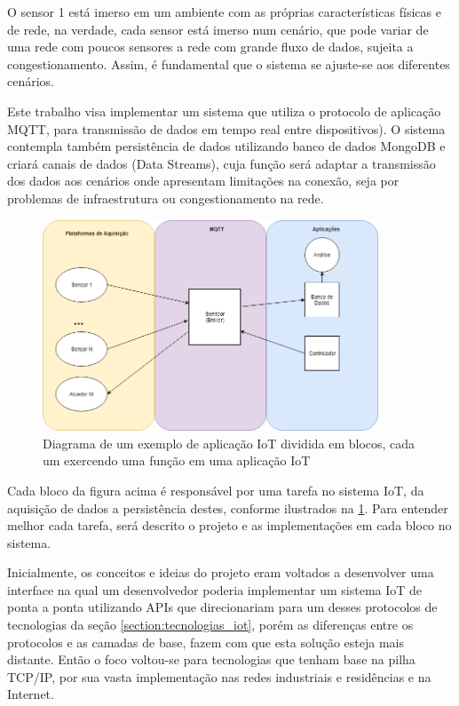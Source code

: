 O sensor 1 está imerso em um ambiente com as próprias características físicas e de rede, na verdade, cada sensor está imerso num cenário, que pode variar  de uma rede com poucos sensores a rede com grande fluxo de dados, sujeita a congestionamento. Assim, é fundamental que o  sistema se ajuste-se aos diferentes cenários.

Este trabalho visa implementar um sistema que utiliza o protocolo de aplicação MQTT, para transmissão de dados em tempo real entre dispositivos). O sistema contempla também persistência de dados utilizando banco de dados MongoDB e criará canais de dados (Data Streams), cuja função será adaptar a transmissão dos dados aos cenários onde apresentam limitações na conexão, seja por problemas de infraestrutura ou congestionamento na rede.

\begin{figure}[h!]
\centering
\includegraphics[width=10cm]{./02_Capitulos/02_Cap1/figures/iot_app-layers}
\caption{Diagrama de um exemplo de aplicação IoT dividida em blocos, cada um exercendo uma função em uma aplicação IoT}
\label{fig:1.1.0/iot_app-layers}
\end{figure}


Cada bloco da figura acima é responsável por uma tarefa no sistema IoT, da aquisição de dados a persistência destes, conforme ilustrados na \ref{fig:1.1.0/iot_app-layers}. Para entender melhor cada tarefa, será descrito o projeto e as implementações em cada bloco no sistema.

Inicialmente, os conceitos e ideias do projeto eram voltados a desenvolver uma interface na qual um desenvolvedor poderia implementar um sistema IoT de ponta a ponta utilizando APIs que direcionariam para um desses protocolos de tecnologias da seção \ref{section:tecnologias_iot}, porém as diferenças entre os protocolos e as camadas de base, fazem com que esta solução esteja mais distante. Então o foco voltou-se  para tecnologias que tenham base na pilha TCP/IP, por sua vasta implementação nas redes industriais e residências e na Internet.

